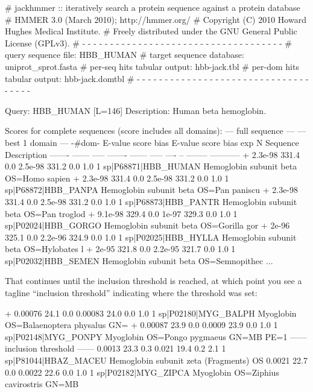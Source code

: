 \begin{sreoutput}
# jackhmmer :: iteratively search a protein sequence against a protein database
# HMMER 3.0 (March 2010); http://hmmer.org/
# Copyright (C) 2010 Howard Hughes Medical Institute.
# Freely distributed under the GNU General Public License (GPLv3).
# - - - - - - - - - - - - - - - - - - - - - - - - - - - - - - - - - - - -
# query sequence file:             HBB_HUMAN
# target sequence database:        uniprot_sprot.fasta
# per-seq hits tabular output:     hbb-jack.tbl
# per-dom hits tabular output:     hbb-jack.domtbl
# - - - - - - - - - - - - - - - - - - - - - - - - - - - - - - - - - - - -

Query:       HBB_HUMAN  [L=146]
Description: Human beta hemoglobin.

Scores for complete sequences (score includes all domains):
   --- full sequence ---   --- best 1 domain ---    -#dom-
    E-value  score  bias    E-value  score  bias    exp  N  Sequence              Description
    ------- ------ -----    ------- ------ -----   ---- --  --------              -----------
+   2.3e-98  331.4   0.0    2.5e-98  331.2   0.0    1.0  1  sp|P68871|HBB_HUMAN   Hemoglobin subunit beta OS=Homo sapien
+   2.3e-98  331.4   0.0    2.5e-98  331.2   0.0    1.0  1  sp|P68872|HBB_PANPA   Hemoglobin subunit beta OS=Pan paniscu
+   2.3e-98  331.4   0.0    2.5e-98  331.2   0.0    1.0  1  sp|P68873|HBB_PANTR   Hemoglobin subunit beta OS=Pan troglod
+   9.1e-98  329.4   0.0      1e-97  329.3   0.0    1.0  1  sp|P02024|HBB_GORGO   Hemoglobin subunit beta OS=Gorilla gor
+     2e-96  325.1   0.0    2.2e-96  324.9   0.0    1.0  1  sp|P02025|HBB_HYLLA   Hemoglobin subunit beta OS=Hylobates l
+     2e-95  321.8   0.0    2.2e-95  321.7   0.0    1.0  1  sp|P02032|HBB_SEMEN   Hemoglobin subunit beta OS=Semnopithec
...
\end{sreoutput}

That continues until the inclusion threshold is reached, at which
point you see a tagline ``inclusion threshold'' indicating where the
threshold was set:

\begin{sreoutput}
+   0.00076   24.1   0.0    0.00083   24.0   0.0    1.0  1  sp|P02180|MYG_BALPH   Myoglobin OS=Balaenoptera physalus GN=
+   0.00087   23.9   0.0     0.0009   23.9   0.0    1.0  1  sp|P02148|MYG_PONPY   Myoglobin OS=Pongo pygmaeus GN=MB PE=1
  ------ inclusion threshold ------
     0.0013   23.3   0.3      0.021   19.4   0.2    2.1  1  sp|P81044|HBAZ_MACEU  Hemoglobin subunit zeta (Fragments) OS
     0.0021   22.7   0.0     0.0022   22.6   0.0    1.0  1  sp|P02182|MYG_ZIPCA   Myoglobin OS=Ziphius cavirostris GN=MB
\end{sreoutput}

